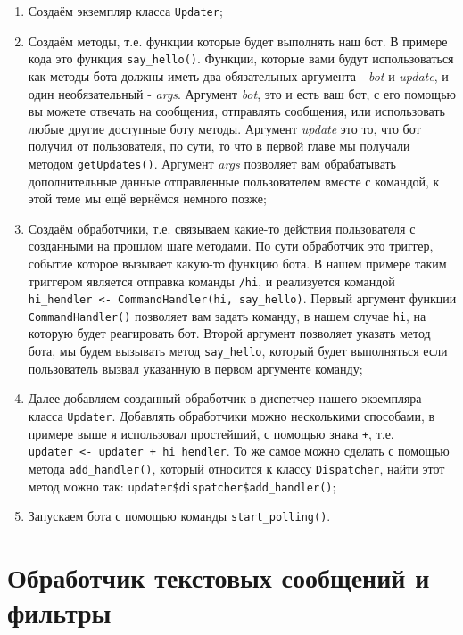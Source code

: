 \documentclass[
]{book}
\providecommand{\tightlist}{%
  \setlength{\itemsep}{0pt}\setlength{\parskip}{0pt}}
\begin{document}
\begin{enumerate}
\def\labelenumi{\arabic{enumi}.}
\tightlist
\item
  Создаём экземпляр класса \texttt{Updater};
\item
  Создаём методы, т.е. функции которые будет выполнять наш бот. В примере кода это функция \texttt{say\_hello()}. Функции, которые вами будут использоваться как методы бота должны иметь два обязательных аргумента - \emph{bot} и \emph{update}, и один необязательный - \emph{args}. Аргумент \emph{bot}, это и есть ваш бот, с его помощью вы можете отвечать на сообщения, отправлять сообщения, или использовать любые другие доступные боту методы. Аргумент \emph{update} это то, что бот получил от пользователя, по сути, то что в первой главе мы получали методом \texttt{getUpdates()}. Аргумент \emph{args} позволяет вам обрабатывать дополнительные данные отправленные пользователем вместе с командой, к этой теме мы ещё вернёмся немного позже;
\item
  Создаём обработчики, т.е. связываем какие-то действия пользователя с созданными на прошлом шаге методами. По сути обработчик это триггер, событие которое вызывает какую-то функцию бота. В нашем примере таким триггером является отправка команды \texttt{/hi}, и реализуется командой \texttt{hi\_hendler\ \textless{}-\ CommandHandler(\textquotesingle{}hi\textquotesingle{},\ say\_hello)}. Первый аргумент функции \texttt{CommandHandler()} позволяет вам задать команду, в нашем случае \texttt{hi}, на которую будет реагировать бот. Второй аргумент позволяет указать метод бота, мы будем вызывать метод \texttt{say\_hello}, который будет выполняться если пользователь вызвал указанную в первом аргументе команду;
\item
  Далее добавляем созданный обработчик в диспетчер нашего экземпляра класса \texttt{Updater}. Добавлять обработчики можно несколькими способами, в примере выше я использовал простейший, с помощью знака \texttt{+}, т.е. \texttt{updater\ \textless{}-\ updater\ +\ hi\_hendler}. То же самое можно сделать с помощью метода \texttt{add\_handler()}, который относится к классу \texttt{Dispatcher}, найти этот метод можно так: \texttt{updater\$dispatcher\$add\_handler()};
\item
  Запускаем бота с помощью команды \texttt{start\_polling()}.
\end{enumerate}

\section{Обработчик текстовых сообщений и фильтры}\label{ux43eux431ux440ux430ux431ux43eux442ux447ux438ux43a-ux442ux435ux43aux441ux442ux43eux432ux44bux445-ux441ux43eux43eux431ux449ux435ux43dux438ux439-ux438-ux444ux438ux43bux44cux442ux440ux44b}
\end{document}
